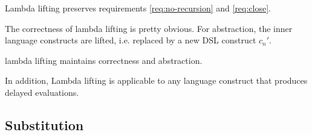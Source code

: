 
\begin{lemma}
  Lambda lifting preserves requirements \ref{req:no-recursion} and \ref{req:close}.
\end{lemma}

The correctness of lambda lifting is pretty obvious.
For abstraction, the inner language constructs are lifted, i.e. replaced by a new DSL construct $c_n'$.

\begin{theorem}
  lambda lifting maintains correctness and abstraction.
\end{theorem}

In addition, Lambda lifting is applicable to any language construct that produces delayed evaluations.

\subsection{Substitution}

